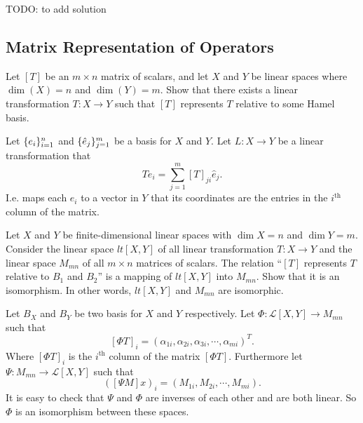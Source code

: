 \begin{solution}
	{\color{red} \noindent TODO: to add solution}
\end{solution}







\subsection{Matrix Representation of Operators}
\begin{problem}
	Let $ [T] $ be an $ m\times n $ matrix of scalars, and let $ X $ and $ Y $ be linear spaces where $ \dim(X) = n $ and $ \dim(Y) = m $. Show that there exists a linear transformation $ T:X\to Y $ such that $ [T] $ represents $ T $ relative to some Hamel basis.
\end{problem}
\begin{solution}
	Let $ \{e_i\}_{i=1}^n $ and $ \{\hat{e}_j\}_{j=1}^m $ be a basis for $ X $ and $ Y $. Let $ L:X\to Y $ be a linear transformation that
	\[ Te_i = \sum_{j=1}^{m} [T]_{ji} \hat{e}_j. \] 
	I.e. maps each $ e_i $ to a vector in $ Y $ that its coordinates are the entries in the $ i^\text{th} $ column of the matrix.
\end{solution}


\begin{problem}
	Let $ X $ and $ Y $ be finite-dimensional linear spaces with $ \dim X = n $ and $ \dim Y = m $. Consider the linear space $ lt[X,Y] $ of all linear transformation $ T:X\to Y $ and the linear space $ M_{mn} $ of all $ m\times n $ matrices of scalars. The relation ``$ [T] $ represents $ T $ relative to $ B_1 $ and $ B_2 $'' is a mapping of $ lt[X,Y] $ into $ M_{mn} $. Show that it is an isomorphism. In other words, $ lt[X,Y] $ and $ M_{mn} $ are isomorphic.
\end{problem}


\begin{solution}
	Let $ B_X $ and $ B_Y $ be two basis for $ X $ and $ Y $ respectively. Let $ \Phi: \mathcal{L}[X,Y]\to M_{mn} $ such that
	\[ [\Phi T]_i = (\alpha_{1i},\alpha_{2i},\alpha_{3i},\cdots,\alpha_{mi})^T. \]
	Where $ [\Phi T]_i $ is the $ i^\text{th} $ column of the matrix $ [\Phi T] $. Furthermore let $ \Psi: M_{mn}\to \mathcal{L}[X,Y] $ such that
	\[ ([\Psi M]x)_i = (M_{1i},M_{2i},\cdots,M_{mi}). \]
	It is easy to check that $ \Psi $ and $ \Phi $ are inverses of each other and are both linear. So $ \Phi $ is an isomorphism between these spaces.
\end{solution}


